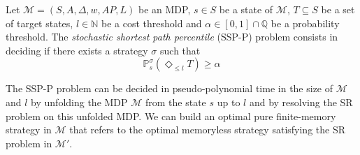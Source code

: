 \begin{definition}
  Let $\mathcal{M} = (S, A, \Delta, w, AP, L)$ be an MDP, $s \in S$ be a state of
  $\mathcal{M}$, $T \subseteq S$ be a set of target states, $l \in \mathbb{N}$
  be a cost threshold and $\alpha \in [0, 1] \cap \mathbb{Q}$ be a probability
  threshold. The \textit{stochastic shortest path percentile} (SSP-P) problem
  consists in deciding if there exists a strategy $\sigma$ such that
  \[
    \mathbb{P}_s^\sigma (\Diamond_{\leq l} T) \geq \alpha
  \]
\end{definition}

\begin{theorem}
  The SSP-P problem can be decided in pseudo-polynomial time in the size of $\mathcal{M}$ and $l$ by unfolding the MDP $\mathcal{M}$ from the state $s$ up to $l$ and by resolving the SR problem on this unfolded MDP.
  We can build an optimal pure finite-memory strategy in $\mathcal{M}$ that refers to the optimal memoryless strategy satisfying the SR problem in $\mathcal{M'}$.
\end{theorem}


